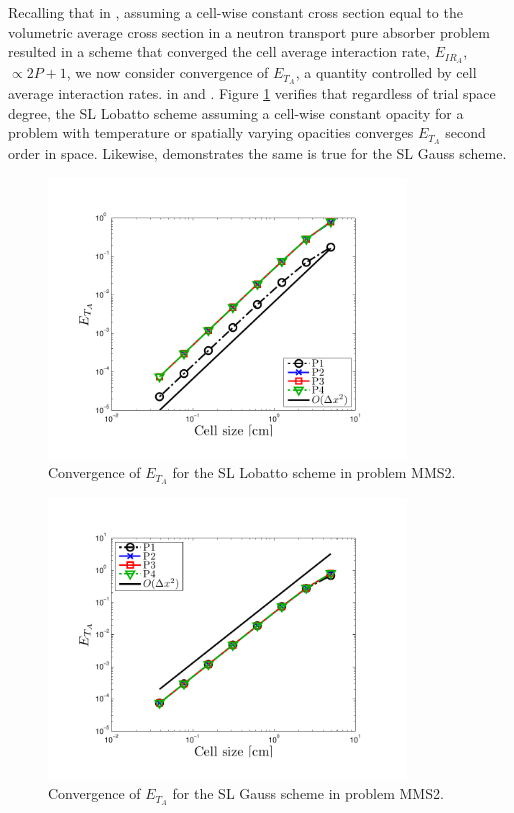 Recalling that in , assuming a cell-wise constant cross section equal to the volumetric average cross section in a neutron transport pure absorber problem
resulted in a scheme that converged the cell average interaction rate, $E_{IR_A}$, $\propto 2P+1$, we now consider convergence of $E_{T_A}$, a quantity controlled by cell average interaction rates.
in  and .
Figure \ref{fig:mms3_constant_lobatto_temp_A} verifies that regardless of trial space degree, the SL Lobatto scheme assuming a cell-wise constant opacity for a problem with temperature or spatially varying opacities converges $E_{T_A}$ second order in space.
Likewise,  demonstrates the same is true for the SL Gauss scheme.
\begin{figure}[!hbp]
\centering
\includegraphics[width=9.5cm,trim=0.25in  0.2in 0.75in 0.5in,clip=true]{chapter6_grey_radtran/Dissertation_Data/MMS3_Constant_XS_SL_Lobatto_temp_A.pdf}
\caption{Convergence of $E_{T_A}$ for the SL Lobatto scheme in problem MMS2.}
\label{fig:mms3_constant_lobatto_temp_A}
\end{figure}
%
%
\begin{figure}[!htp]
\centering
\includegraphics[width=9.5cm,trim=0.25in  0.2in 0.75in 0.5in,clip=true]{chapter6_grey_radtran/Dissertation_Data/MMS3_Constant_XS_SL_Gauss_temp_A.pdf}
\caption{Convergence of $E_{T_A}$ for the SL Gauss scheme in problem MMS2.}
\label{fig:mms3_constant_gauss_temp_A}
\end{figure}

